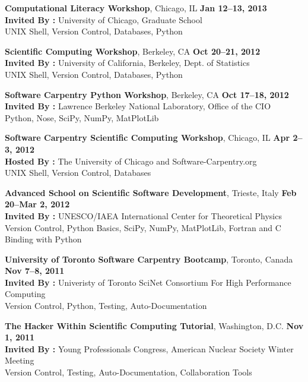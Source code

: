 \documentclass[margin,line]{resume}
\begin{document}
\begin{resume}
    \textbf{Computational Literacy Workshop}, Chicago, IL \hfill \textbf{Jan 12--13, 2013}\\
               \textbf{Invited By : } University of Chicago, Graduate School\\
               UNIX Shell, Version Control, Databases, Python

    \textbf{Scientific Computing Workshop}, Berkeley, CA \hfill \textbf{Oct 20--21, 2012}\\
               \textbf{Invited By : } University of California, Berkeley, Dept. of Statistics\\
               UNIX Shell, Version Control, Databases, Python

    \textbf{Software Carpentry Python Workshop}, Berkeley, CA \hfill \textbf{Oct 17--18, 2012}\\
               \textbf{Invited By : } Lawrence Berkeley National Laboratory, Office of the CIO\\
               Python, Nose, SciPy, NumPy, MatPlotLib

    \textbf{Software Carpentry Scientific Computing Workshop}, Chicago, IL \hfill \textbf{Apr 2--3, 2012}\\
               \textbf{Hosted By : } The University of Chicago and Software-Carpentry.org \\
               UNIX Shell, Version Control, Databases

    \textbf{Advanced School on Scientific Software Development}, Trieste, Italy \hfill \textbf{Feb 20--Mar 2, 2012}\\
               \textbf{Invited By : } UNESCO/IAEA International Center for Theoretical Physics\\
               Version Control, Python Basics, SciPy, NumPy, MatPlotLib, Fortran and C Binding with Python

    \textbf{University of Toronto Software Carpentry Bootcamp}, Toronto, Canada \hfill \textbf{Nov 7--8, 2011}\\
               \textbf{Invited By : } Univeristy of Toronto SciNet Consortium For High Performance Computing\\
               Version Control, Python, Testing, Auto-Documentation

    \textbf{The Hacker Within Scientific Computing Tutorial}, Washington, D.C.  \hfill \textbf{Nov 1, 2011}\\
               \textbf{Invited By : } Young Professionals Congress, American Nuclear Society Winter Meeting\\
               Version Control, Testing, Auto-Documentation, Collaboration Tools


\end{resume}
\end{document}
